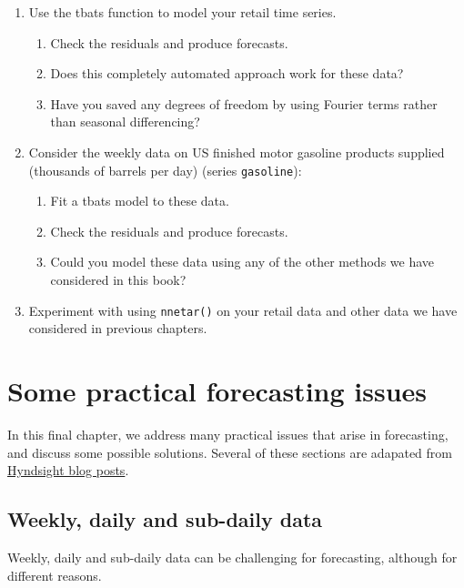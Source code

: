 \documentclass[]{book}
\providecommand{\tightlist}{%
  \setlength{\itemsep}{0pt}\setlength{\parskip}{0pt}}
\begin{document}
\begin{enumerate}
\def\labelenumi{\arabic{enumi}.}
\item
  Use the tbats function to model your retail time series.

  \begin{enumerate}
  \def\labelenumii{\alph{enumii}.}
  \tightlist
  \item
    Check the residuals and produce forecasts.
  \item
    Does this completely automated approach work for these data?
  \item
    Have you saved any degrees of freedom by using Fourier terms rather than seasonal differencing?
  \end{enumerate}
\item
  Consider the weekly data on US finished motor gasoline products supplied (thousands of barrels per day) (series \texttt{gasoline}):

  \begin{enumerate}
  \def\labelenumii{\alph{enumii}.}
  \tightlist
  \item
    Fit a tbats model to these data.
  \item
    Check the residuals and produce forecasts.
  \item
    Could you model these data using any of the other methods we have considered in this book?
  \end{enumerate}
\item
  Experiment with using \texttt{nnetar()} on your retail data and other data we have considered in previous chapters.
\end{enumerate}

\hypertarget{ch-practical}{%
\chapter{Some practical forecasting issues}\label{ch-practical}}

In this final chapter, we address many practical issues that arise in forecasting, and discuss some possible solutions. Several of these sections are adapated from \href{https://robjhyndman.com/hyndsight/}{Hyndsight blog posts}.

\hypertarget{weekly}{%
\section{Weekly, daily and sub-daily data}\label{weekly}}

Weekly, daily and sub-daily data can be challenging for forecasting, although for different reasons.
\end{document}
